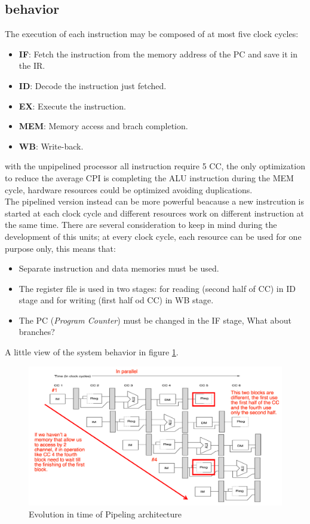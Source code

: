 \documentclass[12pt]{article}
\begin{document}
\subsection{behavior}
The execution of each instruction may be composed of at most five clock cycles:
\begin{itemize}
  \item \textbf{IF}: Fetch the instruction from the memory address of the PC and save it in the IR.
  \item \textbf{ID}: Decode the instruction just fetched.
  \item \textbf{EX}: Execute the instruction.
  \item \textbf{MEM}: Memory access and brach completion.
  \item \textbf{WB}: Write-back.
\end{itemize}
with the unpipelined processor all instruction require 5 CC, the only optimization to reduce the average CPI is completing the ALU instruction during the MEM cycle, hardware resources could be optimized avoiding duplications.\\
The pipelined version instead can be more powerful beacause a new instrcution is started at each clock cycle and different  resources work on different instruction at the same time. There are several consideration to keep in mind during the development of this units; at every clock cycle, each resource can be used for one purpose only, this means that:
\begin{itemize}
  \item Separate instruction and data memories must be used.
  \item The register file is used in two stages: for reading (second half of CC) in ID stage and for writing (first half od CC) in WB stage.
  \item The PC (\textit{Program Counter}) must be changed in the IF stage, What about branches?
\end{itemize}
A little view of the system behavior in figure \ref{fig:time_evo_pipe}.
\begin{figure}[h!]
  \centering
  \includegraphics[width=\linewidth]{images/time_evo_pipe.png}
  \caption{Evolution in time of Pipeling architecture}
  \label{fig:time_evo_pipe}
\end{figure}
\end{document}
